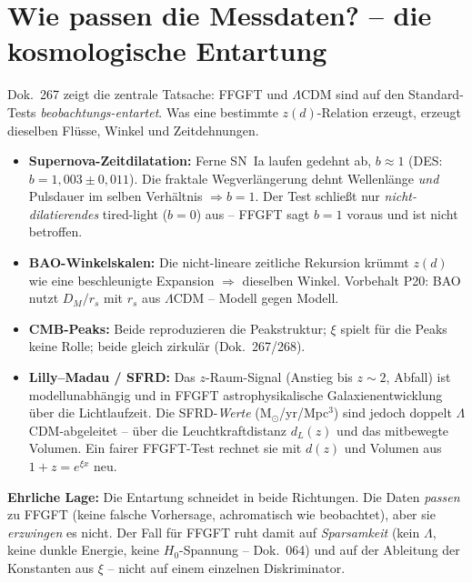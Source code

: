 \section{Wie passen die Messdaten? -- die kosmologische Entartung}

Dok.~267 zeigt die zentrale Tatsache: FFGFT und $\Lambda$CDM sind auf den
Standard-Tests \emph{beobachtungs-entartet}. Was eine bestimmte $z(d)$-Relation
erzeugt, erzeugt dieselben Flüsse, Winkel und Zeitdehnungen.

\begin{itemize}
  \item \textbf{Supernova-Zeitdilatation:} Ferne SN~Ia laufen gedehnt ab,
        $b\approx1$ (DES: $b=1{,}003\pm0{,}011$). Die fraktale Wegverlängerung
        dehnt Wellenlänge \emph{und} Pulsdauer im selben Verhältnis $\Rightarrow b=1$.
        Der Test schließt nur \emph{nicht-dilatierendes} tired-light ($b=0$) aus --
        FFGFT sagt $b=1$ voraus und ist nicht betroffen.
  \item \textbf{BAO-Winkelskalen:} Die nicht-lineare zeitliche Rekursion krümmt
        $z(d)$ wie eine beschleunigte Expansion $\Rightarrow$ dieselben Winkel.
        Vorbehalt P20: BAO nutzt $D_M/r_s$ mit $r_s$ aus $\Lambda$CDM -- Modell
        gegen Modell.
  \item \textbf{CMB-Peaks:} Beide reproduzieren die Peakstruktur; $\xi$ spielt für
        die Peaks keine Rolle; beide gleich zirkulär (Dok.~267/268).
  \item \textbf{Lilly--Madau / SFRD:} Das $z$-Raum-Signal (Anstieg bis $z\sim2$,
        Abfall) ist modellunabhängig und in FFGFT astrophysikalische
        Galaxienentwicklung über die Lichtlaufzeit. Die SFRD-\emph{Werte}
        (M$_\odot$/yr/Mpc$^3$) sind jedoch doppelt $\Lambda$CDM-abgeleitet --
        über die Leuchtkraftdistanz $d_L(z)$ und das mitbewegte Volumen. Ein fairer
        FFGFT-Test rechnet sie mit $d(z)$ und Volumen aus $1+z=e^{\xi x}$ neu.
\end{itemize}

\textbf{Ehrliche Lage:} Die Entartung schneidet in beide Richtungen. Die Daten
\emph{passen} zu FFGFT (keine falsche Vorhersage, achromatisch wie beobachtet),
aber sie \emph{erzwingen} es nicht. Der Fall für FFGFT ruht damit auf
\emph{Sparsamkeit} (kein $\Lambda$, keine dunkle Energie, keine $H_0$-Spannung --
Dok.~064) und auf der Ableitung der Konstanten aus $\xi$ -- nicht auf einem
einzelnen Diskriminator.

